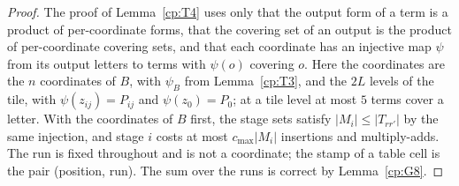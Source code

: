 \documentclass[11pt]{article}
\theoremstyle{definition}
\theoremstyle{remark}
\newcommand{\abs}[1]{\lvert #1\rvert}
\begin{document}
\begin{proof}
The proof of Lemma~\ref{cp:T4} uses only that the output form of a term is a product of per-coordinate forms, that the covering set of an output is the product of per-coordinate covering sets, and that each coordinate has an injective map $\psi$ from its output letters to terms with $\psi(o)$ covering $o$. Here the coordinates are the $n$ coordinates of $B$, with $\psi_B$ from Lemma~\ref{cp:T3}, and the $2L$ levels of the tile, with $\psi(z_{ij})=P_{ij}$ and $\psi(z_0)=P_0$; at a tile level at most $5$ terms cover a letter. With the coordinates of $B$ first, the stage sets satisfy $\abs{M_i}\le\abs{T_{rr'}}$ by the same injection, and stage $i$ costs at most $c_{\max}\abs{M_i}$ insertions and multiply-adds. The run is fixed throughout and is not a coordinate; the stamp of a table cell is the pair (position, run). The sum over the runs is correct by Lemma~\ref{cp:G8}.
\end{proof}
\end{document}
